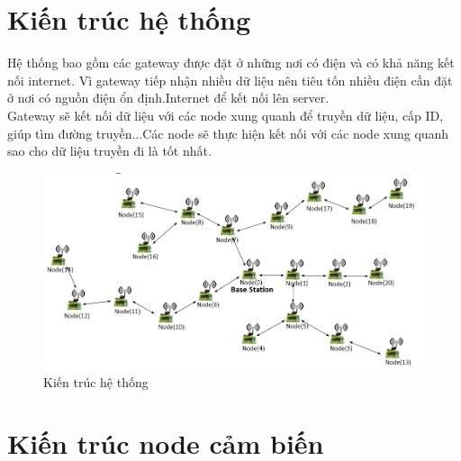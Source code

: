 \section{Kiến trúc hệ thống}
Hệ thống bao gồm các gateway được đặt ở những nơi có điện và có khả năng kết nối internet. Vì gateway tiếp nhận nhiều dữ liệu nên tiêu tốn nhiều điện cần đặt ở nơi có nguồn điện ổn định.Internet để kết nối lên server.\\
Gateway sẽ kết nối dữ liệu với các node xung quanh để truyền dữ liệu, cấp ID, giúp tìm đường truyền...Các node sẽ thực hiện kết nối với các node xung quanh sao cho dữ liệu truyền đi là tốt nhất.
\newpage
\begin{figure}[ht]
\begin{center}
\includegraphics[scale=0.6]{image2/kien-truc-he-thong.png}
\end{center}
\caption{Kiến trúc hệ thống}
\end{figure}

\section{Kiến trúc node cảm biến}

